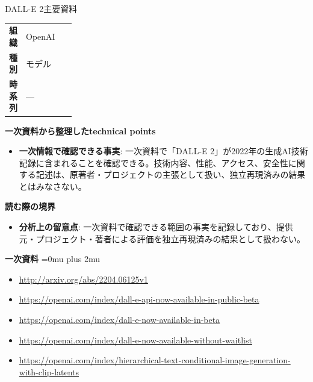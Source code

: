 \begin{technicalnote}{DALL-E 2}{主要資料}
\begingroup
\begin{tabularx}{\linewidth}{@{}>{\bfseries}p{0.22\linewidth}X@{}}
組織 & OpenAI \\
種別 & モデル \\
時系列 & — \\
\end{tabularx}
\smallskip
{\bfseries 一次資料から整理したtechnical points}
\begin{itemize}[leftmargin=1.5em,itemsep=0.35em]
\item \textbf{一次情報で確認できる事実}: 一次資料で「DALL-E 2」が2022年の生成AI技術記録に含まれることを確認できる。技術内容、性能、アクセス、安全性に関する記述は、原著者・プロジェクトの主張として扱い、独立再現済みの結果とはみなさない。
\end{itemize}
\begin{minipage}{\linewidth}
{\bfseries 読む際の境界}
\begin{itemize}[leftmargin=1.5em,itemsep=0.35em]
\item \textbf{分析上の留意点}: 一次資料で確認できる範囲の事実を記録しており、提供元・プロジェクト・著者による評価を独立再現済みの結果として扱わない。
\end{itemize}
\begin{samepage}
{\bfseries 一次資料}
\begingroup\sloppy
\Urlmuskip=0mu plus 2mu\relax
\begin{itemize}[leftmargin=1.5em,itemsep=0.25em]
\item {\scriptsize\url{http://arxiv.org/abs/2204.06125v1}}
\item {\scriptsize\url{https://openai.com/index/dall-e-api-now-available-in-public-beta}}
\item {\scriptsize\url{https://openai.com/index/dall-e-now-available-in-beta}}
\item {\scriptsize\url{https://openai.com/index/dall-e-now-available-without-waitlist}}
\item {\scriptsize\url{https://openai.com/index/hierarchical-text-conditional-image-generation-with-clip-latents}}
\end{itemize}
\endgroup
\end{samepage}
\end{minipage}
\endgroup
\end{technicalnote}
\medskip

